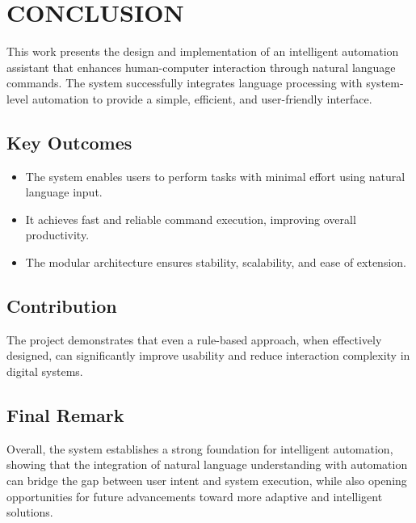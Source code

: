 \documentclass[conference]{IEEEtran}
\begin{document}
\section{\large CONCLUSION}
\noindent
This work presents the design and implementation of an intelligent automation assistant that enhances human-computer interaction through natural language commands. The system successfully integrates language processing with system-level automation to provide a simple, efficient, and user-friendly interface.

\subsection{Key Outcomes}
\noindent
\begin{itemize}
    \item The system enables users to perform tasks with minimal effort using natural language input.
    \item It achieves fast and reliable command execution, improving overall productivity.
    \item The modular architecture ensures stability, scalability, and ease of extension.
\end{itemize}

\subsection{Contribution}
\noindent
The project demonstrates that even a rule-based approach, when effectively designed, can significantly improve usability and reduce interaction complexity in digital systems.

\subsection{Final Remark}
\noindent
Overall, the system establishes a strong foundation for intelligent automation, showing that the integration of natural language understanding with automation can bridge the gap between user intent and system execution, while also opening opportunities for future advancements toward more adaptive and intelligent solutions.
\end{document}
